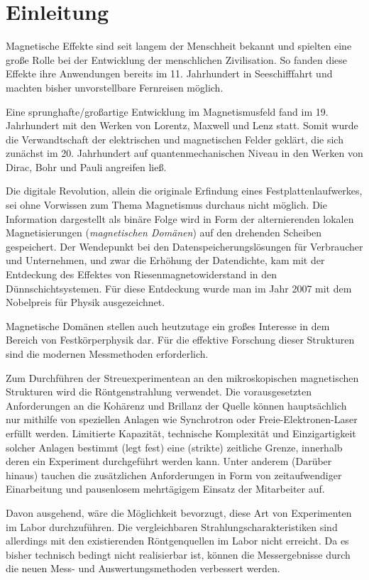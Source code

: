 \chapter{Einleitung}
\label{text:einleitung}
Magnetische Effekte sind seit langem der Menschheit bekannt und spielten eine große Rolle bei der Entwicklung der menschlichen Zivilisation. So fanden diese Effekte ihre Anwendungen bereits im 11. Jahrhundert in Seeschifffahrt und machten bisher unvorstellbare Fernreisen möglich.

\noindent
Eine sprunghafte/großartige Entwicklung im Magnetismusfeld fand im 19. Jahrhundert mit den Werken von Lorentz, Maxwell und Lenz statt. Somit wurde die Verwandtschaft der elektrischen und magnetischen Felder geklärt, die sich zunächst im 20. Jahrhundert auf quantenmechanischen Niveau in den Werken von Dirac, Bohr und Pauli angreifen ließ.

\noindent
Die digitale Revolution, allein die originale Erfindung eines Festplattenlaufwerkes, sei ohne Vorwissen zum Thema Magnetismus durchaus nicht möglich. Die Information dargestellt als binäre Folge wird in Form der alternierenden lokalen Magnetisierungen (\emph{magnetischen Domänen}) auf den drehenden Scheiben gespeichert. Der Wendepunkt bei den Datenspeicherungslösungen für Verbraucher und Unternehmen, und zwar die Erhöhung der Datendichte, kam mit der Entdeckung des Effektes von Riesenmagnetowiderstand in den Dünnschichtsystemen. Für diese Entdeckung wurde man im Jahr 2007 mit dem Nobelpreis für Physik ausgezeichnet.

\noindent
Magnetische Domänen stellen auch heutzutage ein großes Interesse in dem Bereich von Festkörperphysik dar. Für die effektive Forschung dieser Strukturen sind die modernen Messmethoden erforderlich.

\noindent
Zum Durchführen der Streuexperimentean an den mikroskopischen magnetischen Strukturen wird die Röntgenstrahlung verwendet. Die vorausgesetzten Anforderungen an die Kohärenz und Brillanz der Quelle können hauptsächlich nur mithilfe von speziellen Anlagen wie Synchrotron oder Freie-Elektronen-Laser erfüllt werden. Limitierte Kapazität, technische Komplexität und Einzigartigkeit solcher Anlagen bestimmt (legt fest) eine (strikte) zeitliche Grenze, innerhalb deren ein Experiment durchgeführt werden kann. Unter anderem (Darüber hinaus) tauchen die zusätzlichen Anforderungen in Form von zeitaufwendiger Einarbeitung und pausenlosem mehrtägigem Einsatz der Mitarbeiter auf.

\noindent
Davon ausgehend, wäre die Möglichkeit bevorzugt, diese Art von Experimenten im Labor durchzuführen. Die vergleichbaren Strahlungscharakteristiken  sind allerdings mit den existierenden Röntgenquellen im Labor nicht erreicht. Da es bisher technisch bedingt nicht realisierbar ist, können die Messergebnisse durch die neuen Mess- und Auswertungsmethoden verbessert werden.

